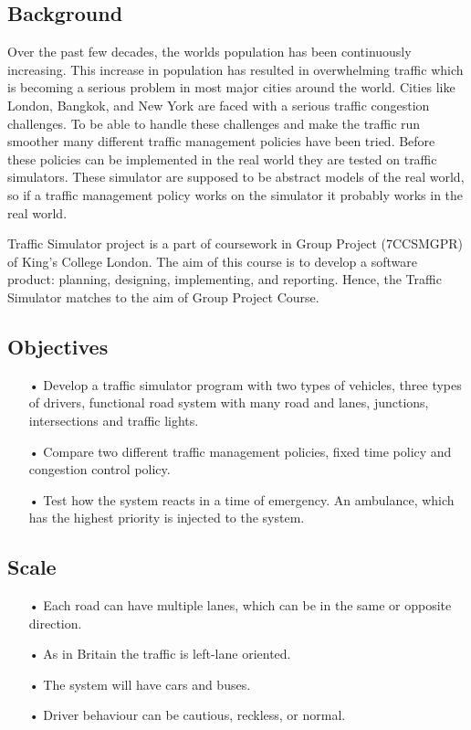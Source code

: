 \documentclass[11pt]{article}
\begin{document}
\subsection{Background}
Over the past few decades, the worlds population has been continuously increasing. This increase in population has resulted in overwhelming traffic which is becoming a serious problem in most major cities around the world. Cities like London, Bangkok, and New York are faced with a serious traffic congestion challenges. To be able to handle these challenges and make the traffic run smoother many different traffic management policies have been tried. Before these policies can be implemented in the real world they are tested on traffic simulators. These simulator are supposed to be abstract models of the real world, so if a traffic management policy works on the simulator it probably works in the real world.

Traffic Simulator project is a part of coursework in Group Project (7CCSMGPR) of King’s College London. The aim of this course is to develop a software product: planning, designing, implementing, and reporting. Hence, the Traffic Simulator matches to the aim of Group Project Course.

\subsection{Objectives}
\begin{itemize}
\item[•] Develop a traffic simulator program with two types of vehicles, three types of drivers, functional road system with many road and lanes, junctions, intersections and traffic lights.
\item[•] Compare two different traffic management policies, fixed time policy and congestion control policy.
\item[•] Test how the system reacts in a time of emergency. An ambulance, which has the highest priority is injected to the system.
\end{itemize}

\subsection{Scale}
\begin{itemize}
\item[•] Each road can have multiple lanes, which can be in the same or opposite direction.
\item[•] As in Britain the traffic is left-lane oriented.
\item[•] The system will have cars and buses.
\item[•] Driver behaviour can be cautious, reckless, or normal.
\end{itemize}
\end{document}
